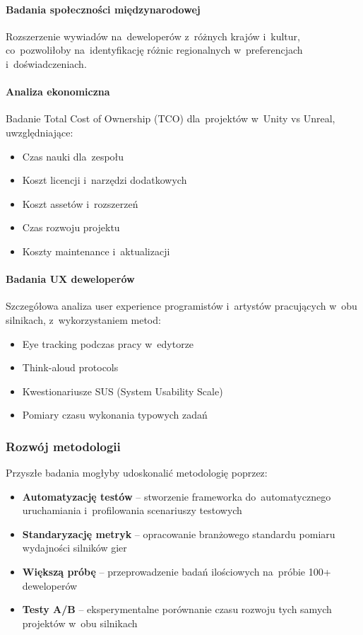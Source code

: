 \paragraph{Badania społeczności międzynarodowej}
Rozszerzenie wywiadów na~deweloperów z~różnych krajów i~kultur, co~pozwoliłoby na~identyfikację różnic regionalnych w~preferencjach i~doświadczeniach.

\paragraph{Analiza ekonomiczna}
Badanie Total Cost of Ownership (TCO) dla~projektów w~Unity vs Unreal, uwzględniające:
\begin{itemize}
    \item Czas nauki dla~zespołu
    \item Koszt licencji i~narzędzi dodatkowych
    \item Koszt assetów i~rozszerzeń
    \item Czas rozwoju projektu
    \item Koszty maintenance i~aktualizacji
\end{itemize}

\paragraph{Badania UX deweloperów}
Szczegółowa analiza user experience programistów i~artystów pracujących w~obu silnikach, z~wykorzystaniem metod:
\begin{itemize}
    \item Eye tracking podczas pracy w~edytorze
    \item Think-aloud protocols
    \item Kwestionariusze SUS (System Usability Scale)
    \item Pomiary czasu wykonania typowych zadań
\end{itemize}

\subsubsection{Rozwój metodologii}

Przyszłe badania mogłyby udoskonalić metodologię poprzez:

\begin{itemize}
    \item \textbf{Automatyzację testów} -- stworzenie frameworka do~automatycznego uruchamiania i~profilowania scenariuszy testowych
    \item \textbf{Standaryzację metryk} -- opracowanie branżowego standardu pomiaru wydajności silników gier
    \item \textbf{Większą próbę} -- przeprowadzenie badań ilościowych na~próbie 100+ deweloperów
    \item \textbf{Testy A/B} -- eksperymentalne porównanie czasu rozwoju tych samych projektów w~obu silnikach
\end{itemize}

